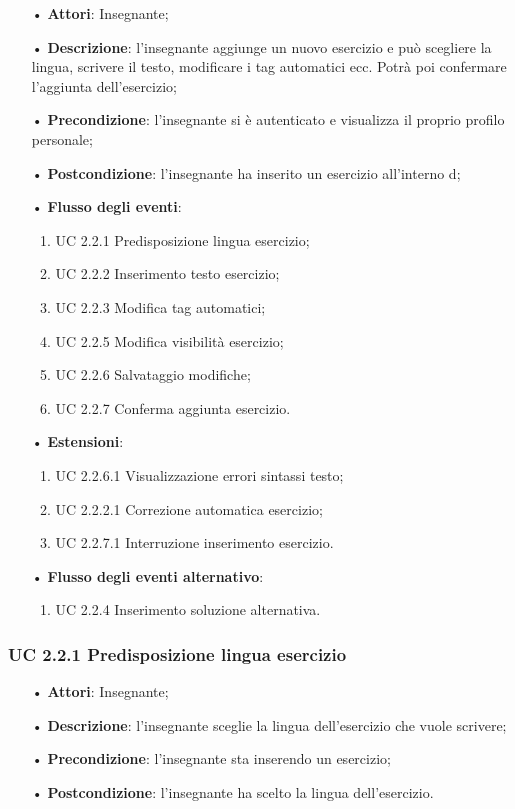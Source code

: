\begin{itemize}
	\item[•] \textbf{Attori}: Insegnante;
	\item[•] \textbf{Descrizione}: l'insegnante aggiunge un nuovo esercizio e può scegliere la lingua, scrivere il testo, modificare i tag automatici ecc. Potrà poi confermare l'aggiunta dell'esercizio;
	\item[•] \textbf{Precondizione}: l'insegnante si è autenticato e visualizza il proprio profilo personale;
	\item[•] \textbf{Postcondizione}: l'insegnante ha inserito un esercizio all'interno d;
	\item[•] \textbf{Flusso degli eventi}:
	\begin{enumerate}
		\item UC 2.2.1 Predisposizione lingua esercizio;
		\item UC 2.2.2 Inserimento testo esercizio;
		\item UC 2.2.3 Modifica tag automatici;

		\item UC 2.2.5 Modifica visibilità esercizio;
		\item UC 2.2.6 Salvataggio modifiche;
		\item UC 2.2.7 Conferma aggiunta esercizio.
	\end{enumerate}
	\item[•] \textbf{Estensioni}:	
	\begin{enumerate}
		\item UC 2.2.6.1 Visualizzazione errori sintassi testo;
		\item UC 2.2.2.1 Correzione automatica esercizio;
		\item UC 2.2.7.1 Interruzione inserimento esercizio.
	\end{enumerate}
	\item[•] \textbf{Flusso degli eventi alternativo}:
	\begin{enumerate}
		\item UC 2.2.4 Inserimento soluzione alternativa.
	\end{enumerate}
\end{itemize}

\subsubsection{UC 2.2.1 Predisposizione lingua esercizio}
\begin{itemize}
	\item[•] \textbf{Attori}: Insegnante;
	\item[•] \textbf{Descrizione}: l'insegnante sceglie la lingua dell'esercizio che vuole scrivere;
	\item[•] \textbf{Precondizione}: l'insegnante sta inserendo un esercizio;
	\item[•] \textbf{Postcondizione}: l'insegnante ha scelto la lingua dell'esercizio.
\end{itemize}
